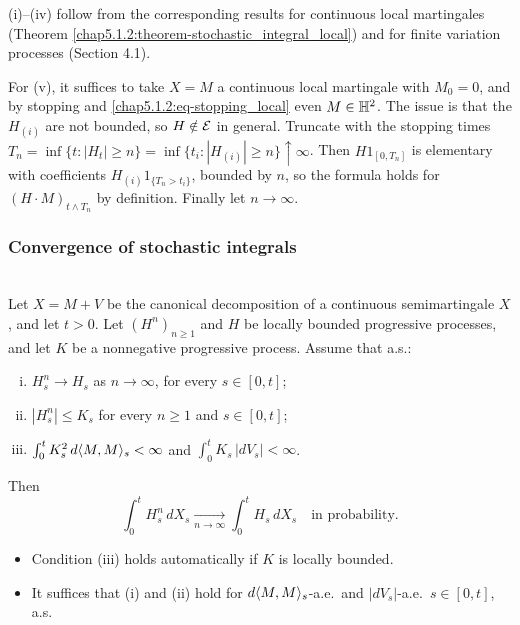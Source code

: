\begin{proofidea}
(i)--(iv) follow from the corresponding results for continuous local martingales (Theorem \ref{chap5.1.2:theorem-stochastic_integral_local}) and for finite variation processes (Section 4.1).

For (v), it suffices to take $X=M$ a continuous local martingale with $M_0=0$, and by stopping and \eqref{chap5.1.2:eq-stopping_local} even $M\in\mathbb{H}^2$. The issue is that the $H_{(i)}$ are not bounded, so $H\notin\mathcal{E}$ in general. Truncate with the stopping times $T_n=\inf\{t:|H_t|\geq n\}=\inf\{t_i:|H_{(i)}|\geq n\}\uparrow\infty$. Then $H1_{[0,T_n]}$ is elementary with coefficients $H_{(i)}1_{\{T_n>t_i\}}$, bounded by $n$, so the formula holds for $(H\cdot M)_{t\wedge T_n}$ by definition. Finally let $n\to\infty$.
\end{proofidea}

\subsubsection{Convergence of stochastic integrals}

\begin{proposition}\label{chap5.1.4:proposition-dominated_convergence}
\\
Let $X=M+V$ be the canonical decomposition of a continuous semimartingale $X$, and let $t>0$. Let $(H^n)_{n\geq1}$ and $H$ be locally bounded progressive processes, and let $K$ be a nonnegative progressive process. Assume that a.s.:
\begin{enumerate}[(i)]
    \item $H^n_s\to H_s$ as $n\to\infty$, for every $s\in[0,t]$;
    \item $|H^n_s|\leq K_s$ for every $n\geq1$ and $s\in[0,t]$;
    \item $\int_0^t K_s^2\,d\langle M,M\rangle_s<\infty$ and $\int_0^t K_s\,|dV_s|<\infty$.
\end{enumerate}
Then
$$\int_0^t H^n_s\,dX_s \xrightarrow[n\to\infty]{} \int_0^t H_s\,dX_s \quad\text{in probability.}$$
\end{proposition}

\begin{remark}\label{chap5.1.4:remark-dominated_convergence}
\begin{itemize}
    \item Condition (iii) holds automatically if $K$ is locally bounded.
    \item It suffices that (i) and (ii) hold for $d\langle M,M\rangle_s$-a.e.\ and $|dV_s|$-a.e.\ $s\in[0,t]$, a.s.
\end{itemize}
\end{remark}

